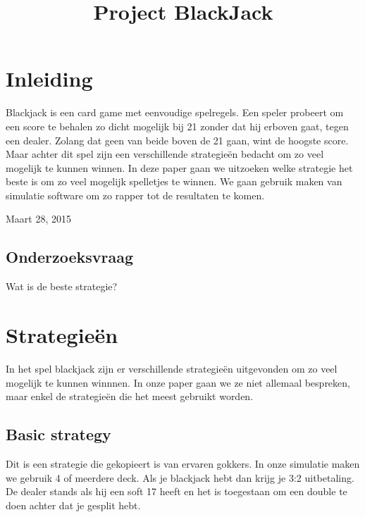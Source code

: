 \documentclass[conference]{IEEEtran}
\begin{document}
\title{Project BlackJack}
\author{
}
\maketitle

\IEEEpeerreviewmaketitle

\section{Inleiding}
Blackjack is een card game met eenvoudige spelregels. Een speler probeert om een score te behalen zo dicht mogelijk bij 21 zonder dat hij erboven gaat, tegen een dealer. Zolang dat geen van beide boven de 21 gaan, wint de hoogste score. Maar achter dit spel zijn een verschillende strategie\"en bedacht om zo veel mogelijk te kunnen winnen. In deze paper gaan we uitzoeken welke strategie het beste is om zo veel mogelijk spelletjes te winnen. We gaan gebruik maken van simulatie software om zo rapper tot de resultaten te komen.
 
\hfill Maart 28, 2015

\subsection{Onderzoeksvraag}
Wat is de beste strategie?



\section{Strategie\"en}
In het spel blackjack zijn er verschillende strategie\"en uitgevonden om zo veel mogelijk te kunnen winnnen. In onze paper gaan we ze niet allemaal bespreken, maar enkel de strategie\"en die het meest gebruikt worden.


\subsection{Basic strategy}

Dit is een strategie die gekopieert is van ervaren gokkers. In onze simulatie maken we gebruik 4 of meerdere deck. Als je blackjack hebt dan krijg je 3:2 uitbetaling. De dealer stands als hij een soft 17 heeft en het is toegestaan om een double te doen achter dat je gesplit hebt. 
\end{document}
